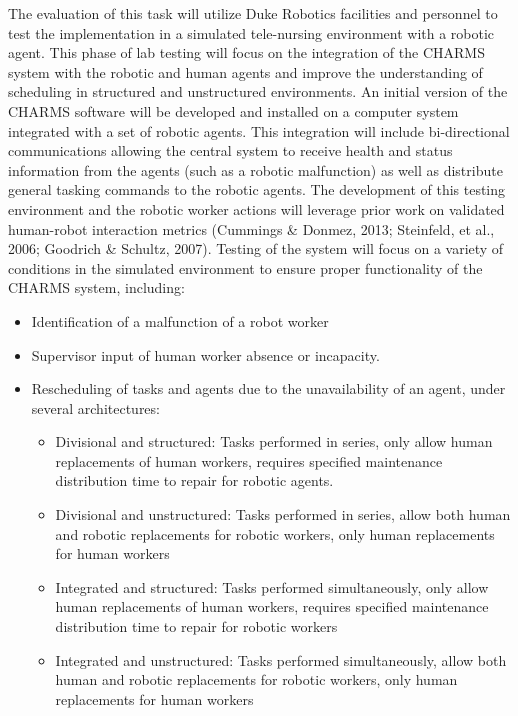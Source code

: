 The evaluation of this task will utilize Duke Robotics facilities and personnel to test the implementation in a simulated tele-nursing environment with a robotic agent. This phase of lab testing will focus on the integration of the CHARMS system with the robotic and human agents and improve the understanding of scheduling in structured and unstructured environments. An initial version of the CHARMS software will be developed and installed on a computer system integrated with a set of robotic agents. This integration will include bi-directional communications allowing the central system to receive health and status information from the agents (such as a robotic malfunction) as well as distribute general tasking commands to the robotic agents. The development of this testing environment and the robotic worker actions will leverage prior work on validated human-robot interaction metrics (Cummings \& Donmez, 2013; Steinfeld, et al., 2006; Goodrich \& Schultz, 2007). Testing of the system will focus on a variety of conditions in the simulated environment to ensure proper functionality of the CHARMS system, including:
\begin{itemize}
    \item Identification of a malfunction of a robot worker
    \item Supervisor input of human worker absence or incapacity.
    \item Rescheduling of tasks and agents due to the unavailability of an agent, under several architectures:
    \begin{itemize}
        \item Divisional and structured: Tasks performed in series, only allow human replacements of human workers, requires specified maintenance distribution time to repair for robotic agents.
        \item Divisional and unstructured: Tasks performed in series, allow both human and robotic replacements for robotic workers, only human replacements for human workers
        \item Integrated and structured: Tasks performed simultaneously, only allow human replacements of human workers, requires specified maintenance distribution time to repair for robotic workers
        \item Integrated and unstructured: Tasks performed simultaneously, allow both human and robotic replacements for robotic workers, only human replacements for human workers
    \end{itemize}
\end{itemize}

